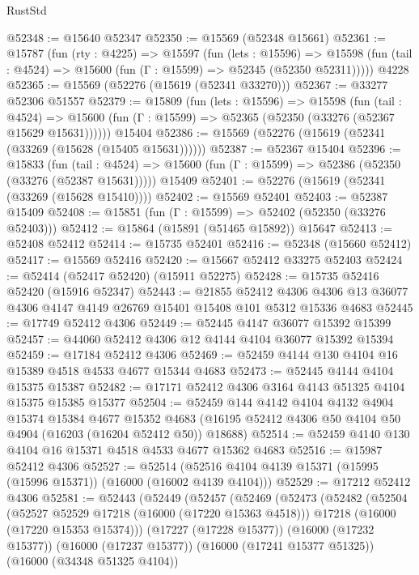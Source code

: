 \begin{lexlean}{RustStd}
\begin{coremodule}
@52348 := @15640 @52347
@52350 := @15569 (@52348 @15661)
@52361 := @15787
    (fun (rty : @4225) =>
    @15597
      (fun (lets : @15596) =>
      @15598 (fun (tail : @4524) => @15600 (fun (Γ : @15599) => @52345 (@52350 @52311)))))
    @4228
@52365 := @15569 (@52276 (@15619 (@52341 @33270)))
@52367 := @33277 @52306 @51557
@52379 := @15809
    (fun (lets : @15596) =>
    @15598
      (fun (tail : @4524) =>
      @15600 (fun (Γ : @15599) => @52365 (@52350 (@33276 (@52367 @15629 @15631))))))
    @15404
@52386 := @15569 (@52276 (@15619 (@52341 (@33269 (@15628 (@15405 @15631))))))
@52387 := @52367 @15404
@52396 := @15833
    (fun (tail : @4524) => @15600 (fun (Γ : @15599) => @52386 (@52350 (@33276 (@52387 @15631)))))
    @15409
@52401 := @52276 (@15619 (@52341 (@33269 (@15628 @15410))))
@52402 := @15569 @52401
@52403 := @52387 @15409
@52408 := @15851 (fun (Γ : @15599) => @52402 (@52350 (@33276 @52403)))
@52412 := @15864 (@15891 (@51465 @15892)) @15647
@52413 := @52408 @52412
@52414 := @15735 @52401
@52416 := @52348 (@15660 @52412)
@52417 := @15569 @52416
@52420 := @15667 @52412 @33275 @52403
@52424 := @52414 (@52417 @52420) (@15911 @52275)
@52428 := @15735 @52416 @52420 (@15916 @52347)
@52443 := @21855
    @52412
    @4306
    @4306
    @13
    @36077
    @4306
    @4147
    @4149
    @26769
    @15401
    @15408
    @101
    @5312
    @15336
    @4683
@52445 := @17749 @52412 @4306
@52449 := @52445 @4147 @36077 @15392 @15399
@52457 := @44060 @52412 @4306 @12 @4144 @4104 @36077 @15392 @15394
@52459 := @17184 @52412 @4306
@52469 := @52459 @4144 @130 @4104 @16 @15389 @4518 @4533 @4677 @15344 @4683
@52473 := @52445 @4144 @4104 @15375 @15387
@52482 := @17171 @52412 @4306 @3164 @4143 @51325 @4104 @15375 @15385 @15377
@52504 := @52459
    @144
    @4142
    @4104
    @4132
    @4904
    @15374
    @15384
    @4677
    @15352
    @4683
    (@16195 @52412 @4306 @50 @4104 @50 @4904 (@16203 (@16204 @52412 @50)) @18688)
@52514 := @52459 @4140 @130 @4104 @16 @15371 @4518 @4533 @4677 @15362 @4683
@52516 := @15987 @52412 @4306
@52527 := @52514 (@52516 @4104 @4139 @15371 (@15995 (@15996 @15371)) (@16000 (@16002 @4139 @4104)))
@52529 := @17212 @52412 @4306
@52581 := @52443
    (@52449
      (@52457
        (@52469
          (@52473
            (@52482
              (@52504
                (@52527 @52529 @17218 (@16000 (@17220 @15363 @4518)))
                @17218
                (@16000 (@17220 @15353 @15374)))
              (@17227 (@17228 @15377))
              (@16000 (@17232 @15377))
              (@16000 (@17237 @15377))
              (@16000 (@17241 @15377 @51325))
              (@16000 (@34348 @51325 @4104))

\end{coremodule}
\end{lexlean}
